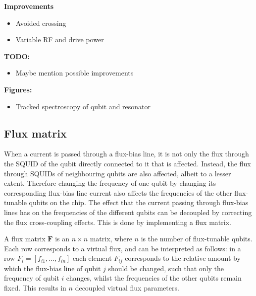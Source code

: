 \documentclass[12pt]{report}
\begin{document}
        \textbf{Improvements}
        \begin{itemize}
          \item Avoided crossing
          \item Variable RF and drive power
        \end{itemize}
        \textbf{TODO:}
        \begin{itemize}
          \item Maybe mention possible improvements
        \end{itemize}
        \textbf{Figures:}
        \begin{itemize}
          \item Tracked spectroscopy of qubit and resonator
        \end{itemize}

      \subsection{Flux matrix}
        When a current is passed through a flux-bias line, it is not only the flux through the SQUID of the qubit directly connected to it that is affected. Instead, the flux through SQUIDs of neighbouring qubits are also affected, albeit to a lesser extent. Therefore changing the frequency of one qubit by changing its corresponding flux-bias line current also affects the frequencies of the other flux-tunable qubits on the chip. The effect that the current passing through flux-bias lines has on the frequencies of the different qubits can be decoupled by correcting the flux cross-coupling effects. This is done by implementing a flux matrix.

        A flux matrix $\boldsymbol{F}$ is an $n \times n$ matrix, where $n$ is the number of flux-tunable qubits. Each row corresponds to a virtual flux, and can be interpreted as follows: in a row $F_i = \left[f_{i1}, \dots, f_{in}\right]$ each element $F_{ij}$ corresponds to the relative amount by which the flux-bias line of qubit $j$ should be changed, such that only the frequency of qubit $i$ changes, whilst the frequencies of the other qubits remain fixed. This results in $n$ decoupled virtual flux parameters.
\end{document}
